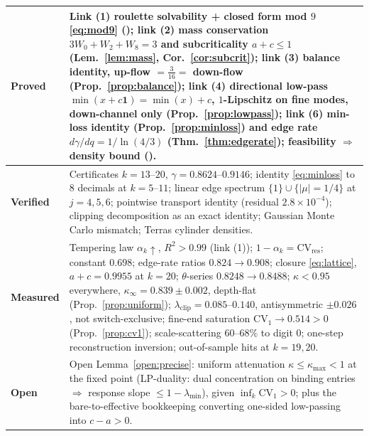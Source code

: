 \documentclass[11pt]{article}
\theoremstyle{definition}
\theoremstyle{remark}
\newcommand{\CV}{\mathrm{CV}}
\newcommand{\lam}{\lambda}
\newcommand{\gam}{\gamma}
\newcommand{\kap}{\kappa}
\begin{document}
\begin{center}
\begin{tabular}{p{} p{}}
\hline
\textbf{Proved} &
Link (1) roulette solvability + closed form mod $9$ \eqref{eq:mod9}
(\cite{Temp26});
link (2) mass conservation $3W_0 + W_2 + W_8 = 3$ and subcriticality
$a + c \leq 1$ (Lem.~\ref{lem:mass}, Cor.~\ref{cor:subcrit});
link (3) balance identity, up-flow $= \tfrac{3}{16} =$ down-flow
(Prop.~\ref{prop:balance});
link (4) directional low-pass $\min(x + c\mathbf 1) = \min(x) + c$,
$1$-Lipschitz on fine modes, down-channel only (Prop.~\ref{prop:lowpass});
link (6) min-loss identity (Prop.~\ref{prop:minloss}) and edge rate
$d\gam/dq = 1/\ln(4/3)$ (Thm.~\ref{thm:edgerate});
feasibility $\Rightarrow$ density bound (\cite{KL03}). \\
\hline
\textbf{Verified} &
Certificates $k = 13$--$20$, $\gam = 0.8624$--$0.9146$;
identity \eqref{eq:minloss} to $8$ decimals at $k = 5$--$11$;
linear edge spectrum $\{1\} \cup \{|\mu| = 1/4\}$ at $j = 4, 5, 6$;
pointwise transport identity (residual $2.8 \times 10^{-4}$);
clipping decomposition as an exact identity; Gaussian Monte Carlo mismatch;
Terras cylinder densities. \\
\hline
\textbf{Measured} &
Tempering law $\alpha_k \uparrow$, $R^2 > 0.99$ (link (1));
$1 - \alpha_k = \CV_{\mathrm{res}}$; constant $0.698$;
edge-rate ratios $0.824 \to 0.908$;
closure \eqref{eq:lattice}, $a + c = 0.9955$ at $k = 20$;
$\theta$-series $0.8248 \to 0.8488$;
$\kap < 0.95$ everywhere, $\kap_\infty = 0.839 \pm 0.002$, depth-flat
(Prop.~\ref{prop:uniform});
$\lam_{\mathrm{clip}} = 0.085$--$0.140$, antisymmetric $\pm 0.026$, not
switch-exclusive;
fine-end saturation $\CV_1 \to 0.514 > 0$ (Prop.~\ref{prop:cv1});
scale-scattering $60$--$68\%$ to digit $0$; one-step reconstruction inversion;
out-of-sample hits at $k = 19, 20$. \\
\hline
\textbf{Open} &
Open Lemma~\ref{open:precise}: uniform attenuation
$\kap \leq \kap_{\max} < 1$ at the fixed point (LP-duality: dual concentration
on binding entries $\Rightarrow$ response slope $\leq 1 - \lam_{\min}$), given
$\inf_k \CV_1 > 0$; plus the bare-to-effective bookkeeping converting one-sided
low-passing into $c - a > 0$. \\
\hline
\end{tabular}
\end{center}

\medskip
\end{document}
